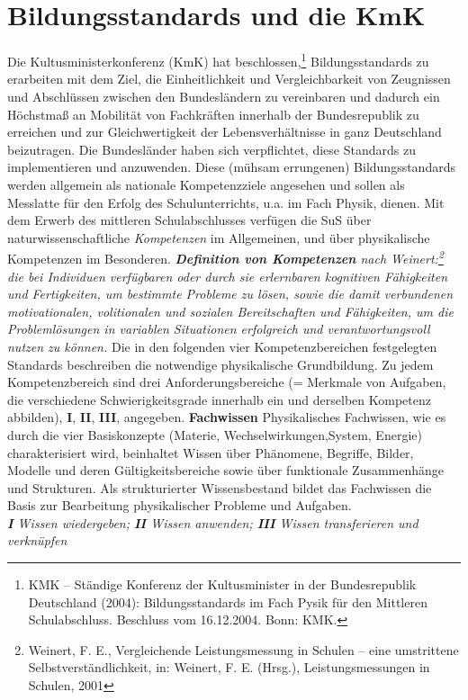 \newpage
\chapter{Bildungsstandards und die KmK}\label{KmK}
Die Kultusministerkonferenz (KmK) hat beschlossen,\footnote{KMK $\textrm{--}$ St{\"a}ndige Konferenz der Kultusminister in der Bundesrepublik Deutschland (2004): Bildungsstandards im Fach Pysik f{\"u}r den Mittleren Schulabschluss. Beschluss vom 16.12.2004. Bonn: KMK.} Bildungsstandards zu erarbeiten mit dem Ziel, die Einheitlichkeit und Vergleichbarkeit von Zeugnissen und Abschl{\"u}ssen zwischen den Bundesl{\"a}ndern zu vereinbaren und dadurch ein H{\"o}chstma{\ss} an Mobilit{\"a}t von Fachkr{\"a}ften innerhalb der Bundesrepublik zu erreichen und  zur Gleichwertigkeit der Lebensverh{\"a}ltnisse in ganz Deutschland beizutragen. Die Bundesl{\"a}nder haben sich verpflichtet, diese Standards zu implementieren und anzuwenden. Diese (m{\"u}hsam errungenen) Bildungsstandards werden allgemein als nationale Kompetenzziele angesehen und sollen als Messlatte f{\"u}r den Erfolg des Schulunterrichts, u.a. im Fach Physik, dienen. 
\mip
Mit dem Erwerb des mittleren Schulabschlusses verf{\"u}gen die SuS {\"u}ber naturwissenschaftliche \emph{Kompetenzen} im Allgemeinen, und {\"u}ber physikalische Kompetenzen im Besonderen. 
\mip
\leftskip=0.5cm \rightskip=0.5cm {\emph{{\textbf{Definition von Kompetenzen}} nach Weinert:\footnote{Weinert, F. E., Vergleichende Leistungsmessung in Schulen $\textrm{--}$ eine umstrittene Selbstverst{\"a}ndlichkeit, in: Weinert, F. E. (Hrsg.), Leistungsmessungen in Schulen, 2001} die bei Individuen verf{\"u}gbaren oder durch sie erlernbaren kognitiven F{\"a}higkeiten und Fertigkeiten, um bestimmte Probleme zu 
l{\"o}sen, sowie die damit verbundenen motivationalen, volitionalen und sozialen Bereitschaften und F{\"a}higkeiten, um die Probleml{\"o}sungen in variablen Situationen erfolgreich und verantwortungsvoll nutzen zu k{\"o}nnen.}} 
\mip
\leftskip=0cm \rightskip=0cm Die in den folgenden vier Kompetenzbereichen festgelegten Standards beschreiben die notwendige physikalische Grundbildung. Zu jedem Kompetenzbereich sind drei Anforderungsbereiche  (= Merkmale von Aufgaben, die verschiedene Schwierigkeitsgrade innerhalb ein und derselben Kompetenz abbilden), \textbf{I}, \textbf{II}, \textbf{III}, angegeben. 
\mip
{\textbf{Fachwissen}} \tabto{7em} \hangindent=2.7cm Physikalisches Fachwissen, wie es durch die vier Basiskonzepte (Materie, Wechselwirkungen,System, Energie) charakterisiert wird, beinhaltet Wissen {\"u}ber Ph{\"a}nomene, Begriffe, Bilder, Modelle und deren G{\"u}ltigkeitsbereiche sowie {\"u}ber funktionale Zusammenh{\"a}nge und Strukturen. Als strukturierter Wissensbestand bildet das Fachwissen die Basis zur Bearbeitung physikalischer Probleme und Aufgaben. \\ \emph{\textbf{I} Wissen wiedergeben; \textbf{II} Wissen anwenden; \textbf{III} Wissen transferieren und verkn{\"u}pfen}

